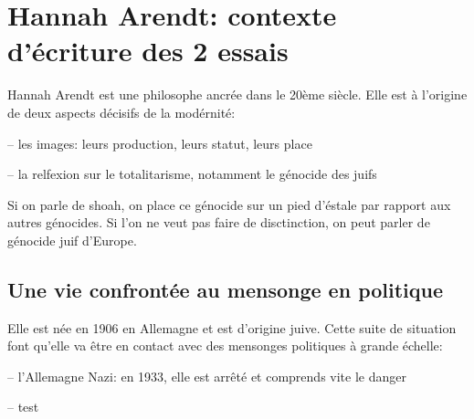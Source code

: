 \section{Hannah Arendt: contexte d'écriture des 2 essais}

Hannah Arendt est une philosophe ancrée dans le 20ème siècle.
Elle est à l'origine de deux aspects décisifs de la modérnité:

-- les images: leurs production, leurs statut, leurs place

-- la relfexion sur le totalitarisme, notamment le génocide des juifs

\begin{rem}
    Si on parle de shoah, on place ce génocide sur un pied d'éstale par rapport aux autres génocides.
    Si l'on ne veut pas faire de disctinction, on peut parler de génocide juif d'Europe.
\end{rem}

\subsection{Une vie confrontée au mensonge en politique}
Elle est née en 1906 en Allemagne et est d'origine juive.
Cette suite de situation font qu'elle va être en contact avec des mensonges politiques à grande échelle:

-- l'Allemagne Nazi: en 1933, elle est arrêté et comprends vite le danger

-- test